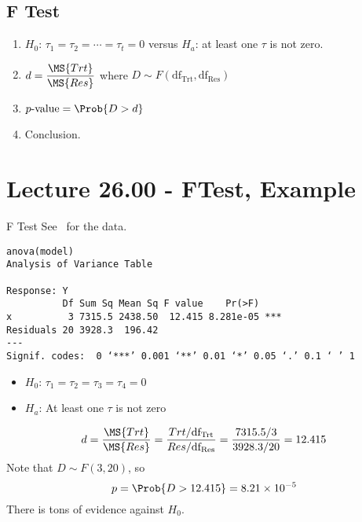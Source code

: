 \subsection*{F Test}
\begin{enumerate}[(1)]
    \item $ H_0 $: $ \tau_1=\tau_2=\cdots=\tau_t=0 $ versus $ H_a $: at least one $\tau$ is not zero.
    \item $ \displaystyle d=\frac{\MS{Trt}}{\MS{Res}}  $ where $ D \sim F(\text{df}_\text{Trt},\text{df}_\text{Res}) $
    \item $ p\text{-value}=\Prob{D>d} $
    \item Conclusion.
\end{enumerate}

\section{Lecture 26.00 - FTest, Example}
\begin{Example}{F Test}{}
    See~ for the data.
    \begin{verbatim}
anova(model)
Analysis of Variance Table

Response: Y
          Df Sum Sq Mean Sq F value    Pr(>F)    
x          3 7315.5 2438.50  12.415 8.281e-05 ***
Residuals 20 3928.3  196.42                      
---
Signif. codes:  0 ‘***’ 0.001 ‘**’ 0.01 ‘*’ 0.05 ‘.’ 0.1 ‘ ’ 1
    \end{verbatim}
    \begin{itemize}
        \item $ H_0 $: $ \tau_1=\tau_2=\tau_3=\tau_4=0 $
        \item $ H_a $: At least one $ \tau $ is not zero
    \end{itemize}
    \[ d=\frac{\MS{Trt}}{\MS{Res}} =\frac{\SS{Trt}/\text{df}_\text{Trt}}{\SS{Res}/\text{df}_\text{Res}}
        =\frac{7315.5/3}{3928.3/20}=12.415   \]
    Note that $ D \sim F(3,20) $, so
    \[ p=\Prob{D>12.415}=8.21 \times 10^{-5} \]
    There is tons of evidence against $ H_0 $.
\end{Example}
